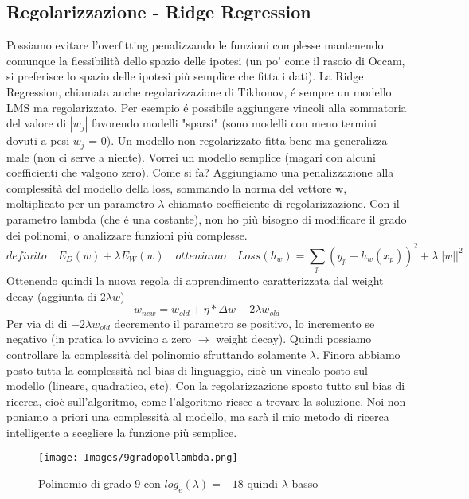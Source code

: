 \documentclass{article}
\begin{document}
\subsection{Regolarizzazione - Ridge Regression}
Possiamo evitare l'overfitting penalizzando le funzioni complesse mantenendo comunque la flessibilità dello spazio delle ipotesi (un po' come il rasoio di Occam, si preferisce lo spazio delle ipotesi più semplice che fitta i dati). \newline
La Ridge Regression, chiamata anche regolarizzazione di Tikhonov, é sempre un modello LMS ma regolarizzato. Per esempio é possibile aggiungere vincoli alla sommatoria del valore di $|w_j|$ favorendo modelli "sparsi" (sono modelli con meno termini dovuti a pesi $w_j$ = 0). \newline 
Un modello non regolarizzato fitta bene ma generalizza male (non ci serve a niente). Vorrei un modello semplice (magari con alcuni coefficienti che valgono zero). Come si fa? Aggiungiamo una penalizzazione alla complessità del modello della loss, sommando la norma del vettore w, moltiplicato per un parametro $\lambda$ chiamato coefficiente di regolarizzazione. Con il parametro lambda (che é una costante), non ho più bisogno di modificare il grado dei polinomi, o analizzare funzioni più complesse.
\begin{equation}
    definito \quad E_D(w)+\lambda E_W(w) \quad otteniamo \quad Loss(h_w)=\sum_{p} (y_p-h_w(x_p))^2+\lambda ||w||^2
\end{equation}
Ottenendo quindi la nuova regola di apprendimento caratterizzata dal weight decay (aggiunta di $2\lambda w$)
\begin{equation}
    w_{new}= w_{old} + \eta*\Delta w - 2 \lambda w_{old}
\end{equation}
Per via di di $-2\lambda w_{old}$ decremento il parametro se positivo, lo incremento se negativo (in pratica lo avvicino a zero $\rightarrow$ weight decay). Quindi possiamo controllare la complessità del polinomio sfruttando solamente $\lambda$.\newline
Finora abbiamo posto tutta la complessità nel bias di linguaggio, cioè un vincolo posto sul modello (lineare, quadratico, etc). Con la regolarizzazione sposto tutto sul bias di ricerca, cioè sull'algoritmo, come l'algoritmo riesce a trovare la soluzione. Noi non poniamo a priori una complessità al modello, ma sarà il mio metodo di ricerca intelligente a scegliere la funzione più semplice.
\begin{figure}[H]
\centering
\texttt{[image: Images/9gradopollambda.png]}
\caption{Polinomio di grado 9 con $log_e(\lambda) = -18$ quindi $\lambda$ basso}
\end{figure}
\end{document}
